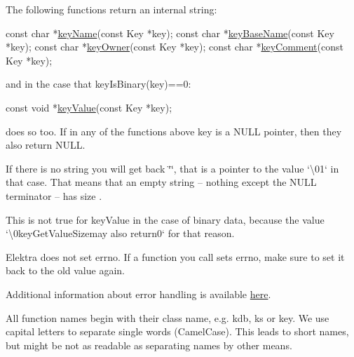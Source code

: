 The following functions return an internal string\+:


\begin{DoxyCode}
\textcolor{keyword}{const} \textcolor{keywordtype}{char} *\hyperlink{group__keyname_ga8e805c726a60da921d3736cda7813513}{keyName}(\textcolor{keyword}{const} Key *key);
\textcolor{keyword}{const} \textcolor{keywordtype}{char} *\hyperlink{group__keyname_gaaff35e7ca8af5560c47e662ceb9465f5}{keyBaseName}(\textcolor{keyword}{const} Key *key);
\textcolor{keyword}{const} \textcolor{keywordtype}{char} *\hyperlink{owner_8c_af6485fb8599714b6bbd830cf915ffea5}{keyOwner}(\textcolor{keyword}{const} Key *key);
\textcolor{keyword}{const} \textcolor{keywordtype}{char} *\hyperlink{group__meta_gac89fd319783b3457db45b4c09e55274a}{keyComment}(\textcolor{keyword}{const} Key *key);
\end{DoxyCode}


and in the case that {\ttfamily key\+Is\+Binary(key)==0}\+:


\begin{DoxyCode}
\textcolor{keyword}{const} \textcolor{keywordtype}{void} *\hyperlink{group__keyvalue_ga6f29609c5da53c6dc26a98678d5752af}{keyValue}(\textcolor{keyword}{const} Key *key);
\end{DoxyCode}


does so too. If in any of the functions above {\ttfamily key} is a {\ttfamily N\+U\+LL} pointer, then they also return {\ttfamily N\+U\+LL}.

If there is no string you will get back {\ttfamily \char`\"{}\char`\"{}}, that is a pointer to the value `\textquotesingle{}\textbackslash{}01` in that case. That means that an empty string – nothing except the N\+U\+LL terminator – has size {}.

This is not true for {\ttfamily key\+Value} in the case of binary data, because the value `\textquotesingle{}\textbackslash{}0key\+Get\+Value\+Size{\ttfamily may also return}0` for that reason.

Elektra does not set {\ttfamily errno}. If a function you call sets {\ttfamily errno}, make sure to set it back to the old value again.

Additional information about error handling is available \hyperlink{doc_dev_error-handling_md}{here}.

All function names begin with their class name, e.\+g. {\ttfamily kdb}, {\ttfamily ks} or {\ttfamily key}. We use capital letters to separate single words (Camel\+Case). This leads to short names, but might be not as readable as separating names by other means.

